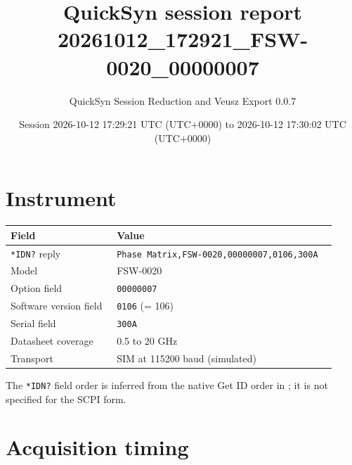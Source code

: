\documentclass[11pt]{article}
\title{QuickSyn session report\\[0.3em]\large 20261012\_172921\_FSW-0020\_00000007}
\author{QuickSyn Session Reduction and Veusz Export 0.0.7}
\date{Session 2026-10-12 17:29:21 UTC (UTC+0000) to 2026-10-12 17:30:02 UTC (UTC+0000)}
\begin{document}
\maketitle
\thispagestyle{fancy}
\begin{center}\end{center}

\tableofcontents
\clearpage

\section{Instrument}

\begin{center}
\begin{tabular}{@{}p{0.3\linewidth}p{0.62\linewidth}@{}}
\toprule
\textbf{Field} & \textbf{Value} \\
\midrule
\texttt{*IDN?} reply & \texttt{Phase Matrix,FSW-0020,00000007,0106,300A} \\
Model & FSW-0020 \\
Option field & \texttt{00000007} \\
Software version field & \texttt{0106} (= 106) \\
Serial field & \texttt{300A} \\
Datasheet coverage & 0.5 to 20 GHz \\
Transport & SIM at 115200 baud (simulated) \\
\bottomrule
\end{tabular}
\end{center}

The \texttt{*IDN?} field order is inferred from the native Get ID order in
\cite{nicomms}; it is not specified for the SCPI form.

\section{Acquisition timing}
\end{document}
